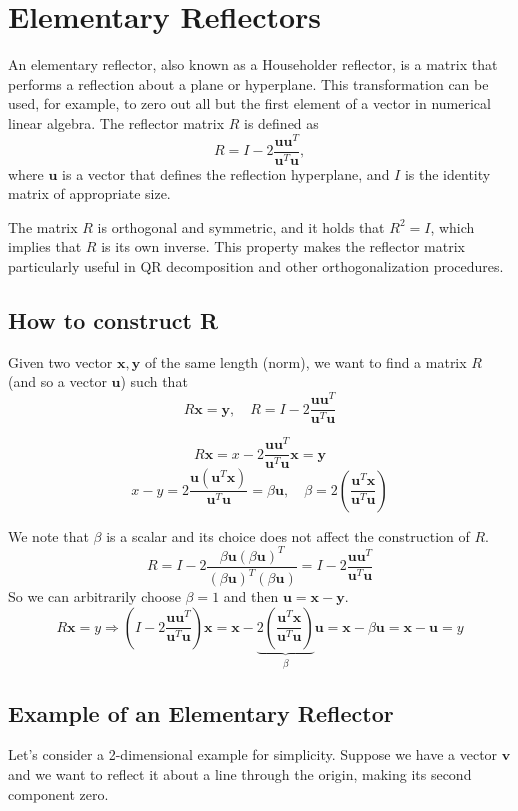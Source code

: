 \section{Elementary Reflectors}

An elementary reflector, also known as a Householder reflector, is a matrix that
performs a reflection about a plane or hyperplane. This transformation can be
used, for example, to zero out all but the first element of a vector in numerical
linear algebra. The reflector matrix \( R \) is defined as
\begin{equation*}
R = I - 2\frac{\mathbf{u}\mathbf{u}^T}{\mathbf{u}^T\mathbf{u}},
\end{equation*}
where \( \mathbf{u} \) is a vector that defines the reflection hyperplane, and \( I \) is the identity matrix of appropriate size.

The matrix \( R \) is orthogonal and symmetric, and it holds that \( R^2 = I \), which implies that \( R \) is its own inverse.
This property makes the reflector matrix particularly useful in QR decomposition and other orthogonalization procedures.
\subsection{How to construct R}
Given two vector $\mathbf{x}, \mathbf{y}$ of the same length (norm), we want to find a matrix $R$ (and so a vector $\mathbf{u}$) such that
$$ R\mathbf{x} = \mathbf{y}, \quad R = I - 2\frac{\mathbf{u}\mathbf{u}^T}{\mathbf{u}^T\mathbf{u}} $$

$$ R\mathbf{x} = x - 2\frac{\mathbf{u}\mathbf{u}^T}{\mathbf{u}^T\mathbf{u}}\mathbf{x} = \mathbf{y} $$
$$ x- y = 2\frac{\mathbf{u}(\mathbf{u}^T\mathbf{x})}{\mathbf{u}^T\mathbf{u}} = \beta \mathbf{u}, \quad \beta = 2\left(\frac{\mathbf{u}^T\mathbf{x}}{\mathbf{u}^T\mathbf{u}}\right)$$

We note that $\beta$ is a scalar and its choice does not affect the construction of $R$.
$$ R = I - 2 \frac{\beta \mathbf{u}(\beta \mathbf{u})^T}{(\beta \mathbf{u})^T (\beta \mathbf{u})} = I - 2 \frac{\mathbf{u}\mathbf{u}^T}{\mathbf{u}^T\mathbf{u}} $$
So we can arbitrarily choose $\beta = 1$ and then $\mathbf{u} = \mathbf{x} - \mathbf{y}$.
$$ R\mathbf{x} = y \Rightarrow (I - 2 \frac{\mathbf{u}\mathbf{u}^T}{\mathbf{u}^T\mathbf{u}})\mathbf{x} = \mathbf{x} - \underbrace{2\left(\frac{\mathbf{u}^T\mathbf{x}}{\mathbf{u}^T\mathbf{u}}\right)}_{\beta}\mathbf{u} = \mathbf{x} - \beta \mathbf{u} = \mathbf{x} - \mathbf{u} = y $$
\subsection*{Example of an Elementary Reflector}
Let's consider a 2-dimensional example for simplicity. Suppose we have a vector
\( \mathbf{v} \) and we want to reflect it about a line through the origin, making its second component zero.

